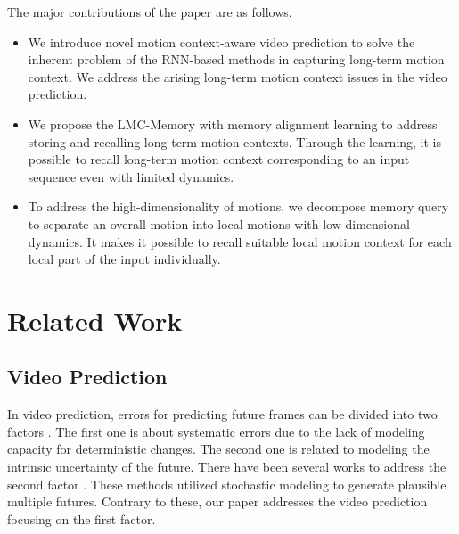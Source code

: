 \documentclass[final]{cvpr}
\begin{document}
The major contributions of the paper are as follows.
\vspace{-0.3cm}
\begin{itemize}
	\setlength\itemsep{-0.3em}
	\item We introduce novel motion context-aware video prediction to solve the inherent problem of the RNN-based methods in capturing long-term motion context. We address the arising long-term motion context issues in the video prediction.
	\item	We propose the LMC-Memory with memory alignment learning to address storing and recalling long-term motion contexts. Through the learning, it is possible to recall long-term motion context corresponding to an input sequence even with limited dynamics.
	\item To address the high-dimensionality of motions, we decompose memory query to separate an overall motion into local motions with low-dimensional dynamics. It makes it possible to recall suitable local motion context for each local part of the input individually.
\end{itemize}

\section{Related Work}
\subsection{Video Prediction}
In video prediction, errors for predicting future frames can be divided into two factors \cite{wang2018eidetic}. The first one is about systematic errors due to the lack of modeling capacity for deterministic changes. The second one is related to modeling the intrinsic uncertainty of the future. There have been several works to address the second factor \cite{babaeizadeh2017stochastic, lee2018stochastic, denton2018stochastic, xu2020stochastic}. These methods utilized stochastic modeling to generate plausible multiple futures. Contrary to these, our paper addresses the video prediction focusing on the first factor. 
\end{document}
